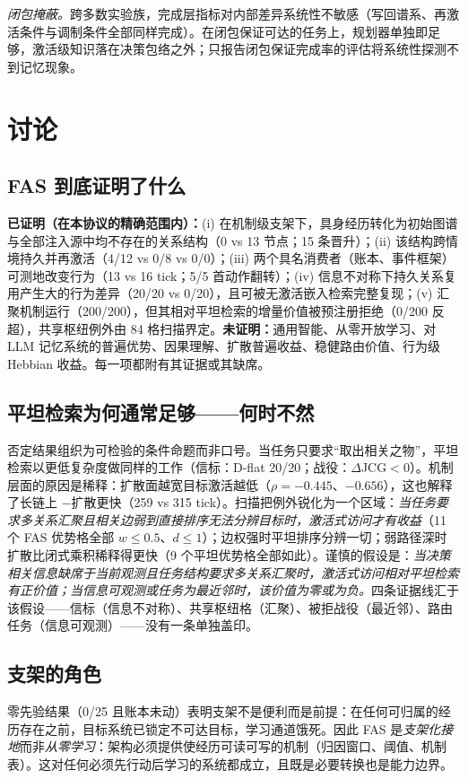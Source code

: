 \documentclass[10pt,a4paper]{ctexart}
\begin{document}
\emph{闭包掩蔽。}跨多数实验族，完成层指标对内部差异系统性不敏感（写回谱系、再激活条件与调制条件全部同样完成）。在闭包保证可达的任务上，规划器单独即足够，激活级知识落在决策包络之外；只报告闭包保证完成率的评估将系统性探测不到记忆现象。

\section{讨论}
\label{sec:discussion}

\subsection{FAS 到底证明了什么}
\textbf{已证明（在本协议的精确范围内）：}(i) 在机制级支架下，具身经历转化为初始图谱与全部注入源中均不存在的关系结构（0 vs 13 节点；15 条晋升）；(ii) 该结构跨情境持久并再激活（4/12 vs 0/8 vs 0/0）；(iii) 两个具名消费者（账本、事件框架）可测地改变行为（13 vs 16 tick；5/5 首动作翻转）；(iv) 信息不对称下持久关系复用产生大的行为差异（20/20 vs 0/20），且可被无激活嵌入检索完整复现；(v) 汇聚机制运行（200/200），但其相对平坦检索的增量价值被预注册拒绝（0/200 反超），共享枢纽例外由 84 格扫描界定。\textbf{未证明：}通用智能、从零开放学习、对 LLM 记忆系统的普遍优势、因果理解、扩散普遍收益、稳健路由价值、行为级 Hebbian 收益。每一项都附有其证据或其缺席。

\subsection{平坦检索为何通常足够——何时不然}
否定结果组织为可检验的条件命题而非口号。当任务只要求“取出相关之物”，平坦检索以更低复杂度做同样的工作（信标：D-flat 20/20；战役：$\Delta$JCG${<}0$）。机制层面的原因是稀释：扩散面越宽目标激活越低（$\rho{=}{-}0.445$、${-}0.656$），这也解释了长链上 $-$扩散更快（259 vs 315 tick）。扫描把例外锐化为一个区域：\emph{当任务要求多关系汇聚且相关边弱到直接排序无法分辨目标时，激活式访问才有收益}（11 个 FAS 优势格全部 $w{\le}0.5$、$d{\le}1$）；边权强时平坦排序分辨一切；弱路径深时扩散比闭式乘积稀释得更快（9 个平坦优势格全部如此）。谨慎的假设是：\emph{当决策相关信息缺席于当前观测且任务结构要求多关系汇聚时，激活式访问相对平坦检索有正价值；当信息可观测或任务为最近邻时，该价值为零或为负。}四条证据线汇于该假设——信标（信息不对称）、共享枢纽格（汇聚）、被拒战役（最近邻）、路由任务（信息可观测）——没有一条单独盖印。

\subsection{支架的角色}
零先验结果（0/25 且账本未动）表明支架不是便利而是前提：在任何可归属的经历存在之前，目标系统已锁定不可达目标，学习通道饿死。因此 FAS 是\emph{支架化接地}而非\emph{从零学习}：架构必须提供使经历可读可写的机制（归因窗口、阈值、机制表）。这对任何必须先行动后学习的系统都成立，且既是必要转换也是能力边界。
\end{document}
